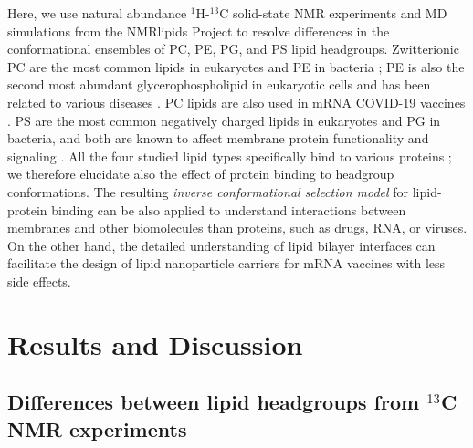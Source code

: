 \documentclass[journal=jpcbfk,manuscript=article]{achemso}
\begin{document}
Here, we use natural abundance $^1$H-$^{13}$C solid-state NMR experiments and MD simulations from the NMRlipids Project
to resolve differences in the conformational ensembles of PC, PE, PG, and PS lipid headgroups.
Zwitterionic PC are the most common lipids in eukaryotes and PE in bacteria \cite{vanmeer08,sohlenkamp16};
PE is also the second most abundant glycerophospholipid in eukaryotic cells
and has been related to various diseases \cite{vance15,calzada16,patel17}.
PC lipids are also used in mRNA COVID-19 vaccines \cite{schoenmaker21}.
PS are the most common negatively charged lipids in eukaryotes and PG in bacteria,
and both are known to affect membrane protein functionality and signaling \cite{lemmon08,leventis10,sohlenkamp16,hariharan18}.
All the four studied lipid types specifically bind to various proteins \cite{yeagle14};
we therefore elucidate also the effect of protein binding to headgroup conformations.
The resulting {\it inverse conformational selection model} for lipid-protein binding can be also
applied to understand interactions between membranes and other biomolecules than proteins, such as drugs, RNA, or viruses.
On the other hand, the detailed understanding of lipid bilayer interfaces can facilitate the design
of lipid nanoparticle carriers for mRNA vaccines with less side effects.


\section{Results and Discussion}

\subsection{Differences between lipid headgroups from $^{13}$C NMR experiments}
\end{document}
